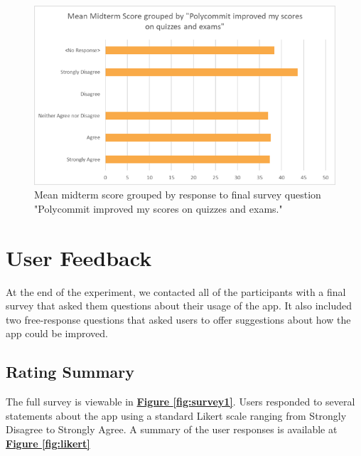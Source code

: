 \begin{figure}[h]
	\includegraphics[width=1.0\linewidth]{figures/improved-vs-score}
	\caption{Mean midterm score grouped by response to final survey question "Polycommit improved my scores on quizzes and exams."}
	\label{fig:overconfidence}
\end{figure}

\section {User Feedback}

\par At the end of the experiment, we contacted all of the participants with a final survey that asked them questions about their usage of the app. It also included two free-response questions that asked users to offer suggestions about how the app could be improved.

\subsection{Rating Summary}

\par The full survey is viewable in \textbf{\hyperref[fig:survey1]{Figure \ref*{fig:survey1}}}. Users responded to several statements about the app using a standard Likert scale ranging from Strongly Disagree to Strongly Agree. A summary of the user responses is available at \textbf{\hyperref[fig:likert]{Figure \ref*{fig:likert}}}


